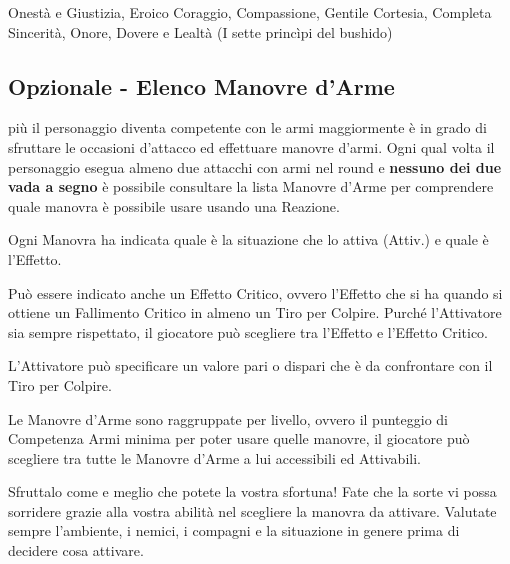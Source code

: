 \begin{multicols}{2}
\begin{changemargin}{0.3cm}{0.3cm}\begin{enfasi}{
Onestà e Giustizia, Eroico Coraggio, Compassione, Gentile Cortesia, Completa Sincerità, Onore, Dovere e Lealtà (I sette princìpi del bushido)
}\end{enfasi}\end{changemargin}


\subsection{Opzionale - Elenco Manovre d'Arme}\hypertarget{elencotalentiarmi}{}\label{elencotalentiarmi}

più il personaggio diventa competente con le armi maggiormente è in grado di sfruttare le occasioni d'attacco ed effettuare manovre d'armi. Ogni qual volta il personaggio esegua almeno due attacchi con armi nel round e \textbf{nessuno dei due vada a segno} è possibile consultare la lista Manovre d'Arme per comprendere quale manovra è possibile usare usando una Reazione.

Ogni Manovra ha indicata quale è la situazione che lo attiva (Attiv.) e quale è l'Effetto.

Può essere indicato anche un Effetto Critico, ovvero l'Effetto che si ha quando si ottiene un Fallimento Critico in almeno un Tiro per Colpire. Purché l'Attivatore sia sempre rispettato, il giocatore può scegliere tra l'Effetto e l'Effetto Critico.

L'Attivatore può specificare un valore pari o dispari che è da confrontare con il Tiro per Colpire.

Le Manovre d'Arme sono raggruppate per livello, ovvero il punteggio di Competenza Armi minima per poter usare quelle manovre, il giocatore può scegliere tra tutte le Manovre d'Arme a lui accessibili ed Attivabili.

\begin{changemargin}{0.3cm}{0.3cm}\begin{tcolorbox}[title = Ho mancato!]
		Sfruttalo come e meglio che potete la vostra sfortuna! Fate che la sorte vi possa sorridere grazie alla vostra abilità nel scegliere la manovra da attivare. Valutate sempre l'ambiente, i nemici, i compagni e la situazione in genere prima di decidere cosa attivare.
\end{tcolorbox}\end{changemargin}

\begin{itemize}[leftmargin=*]
	\setlength{\itemsep}{0pt}


\end{itemize}
\end{multicols}
